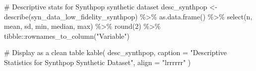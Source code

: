\documentclass[
  letterpaper,
  DIV=11,
  numbers=noendperiod]{scrartcl}
\newenvironment{Shaded}{\begin{snugshade}}{\end{snugshade}}
\newcommand{\AttributeTok}[1]{\textcolor[rgb]{0.40,0.45,0.13}{#1}}
\newcommand{\CommentTok}[1]{\textcolor[rgb]{0.37,0.37,0.37}{#1}}
\newcommand{\DecValTok}[1]{\textcolor[rgb]{0.68,0.00,0.00}{#1}}
\newcommand{\FunctionTok}[1]{\textcolor[rgb]{0.28,0.35,0.67}{#1}}
\newcommand{\NormalTok}[1]{\textcolor[rgb]{0.00,0.23,0.31}{#1}}
\newcommand{\OtherTok}[1]{\textcolor[rgb]{0.00,0.23,0.31}{#1}}
\newcommand{\SpecialCharTok}[1]{\textcolor[rgb]{0.37,0.37,0.37}{#1}}
\newcommand{\StringTok}[1]{\textcolor[rgb]{0.13,0.47,0.30}{#1}}
\begin{document}
\begin{Shaded}
\begin{Highlighting}[]
\CommentTok{\# Descriptive stats for Synthpop synthetic dataset}
\NormalTok{desc\_synthpop }\OtherTok{\textless{}{-}} \FunctionTok{describe}\NormalTok{(syn\_data\_low\_fidelity\_synthpop) }\SpecialCharTok{\%\textgreater{}\%}
  \FunctionTok{as.data.frame}\NormalTok{() }\SpecialCharTok{\%\textgreater{}\%}
  \FunctionTok{select}\NormalTok{(n, mean, sd, min, median, max) }\SpecialCharTok{\%\textgreater{}\%}
  \FunctionTok{round}\NormalTok{(}\DecValTok{2}\NormalTok{) }\SpecialCharTok{\%\textgreater{}\%}
\NormalTok{  tibble}\SpecialCharTok{::}\FunctionTok{rownames\_to\_column}\NormalTok{(}\StringTok{"Variable"}\NormalTok{)}

\CommentTok{\# Display as a clean table}
\FunctionTok{kable}\NormalTok{(}
\NormalTok{  desc\_synthpop,}
  \AttributeTok{caption =} \StringTok{"Descriptive Statistics for Synthpop Synthetic Dataset"}\NormalTok{,}
  \AttributeTok{align =} \StringTok{"lrrrrrr"}
\NormalTok{)}
\end{Highlighting}
\end{Shaded}
\end{document}
